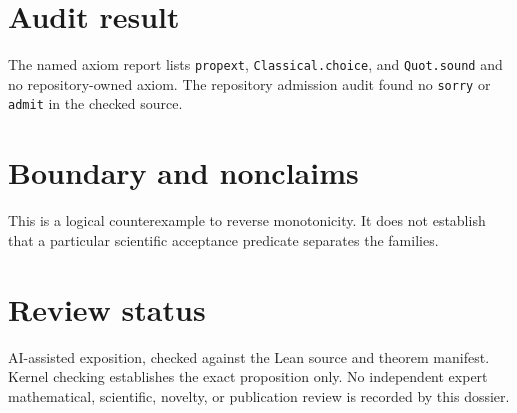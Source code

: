 \documentclass[11pt]{article}
\begin{document}
\section{Audit result}
The named axiom report lists \texttt{propext}, \texttt{Classical.choice}, and
\texttt{Quot.sound} and no repository-owned axiom.  The repository admission audit found no
\texttt{sorry} or \texttt{admit} in the checked source.

\section{Boundary and nonclaims}
This is a logical counterexample to reverse monotonicity.  It does not establish that a particular scientific acceptance predicate separates the families.

\section{Review status}
AI-assisted exposition, checked against the Lean source and theorem manifest.  Kernel checking
establishes the exact proposition only.  No independent expert mathematical, scientific,
novelty, or publication review is recorded by this dossier.
\end{document}
